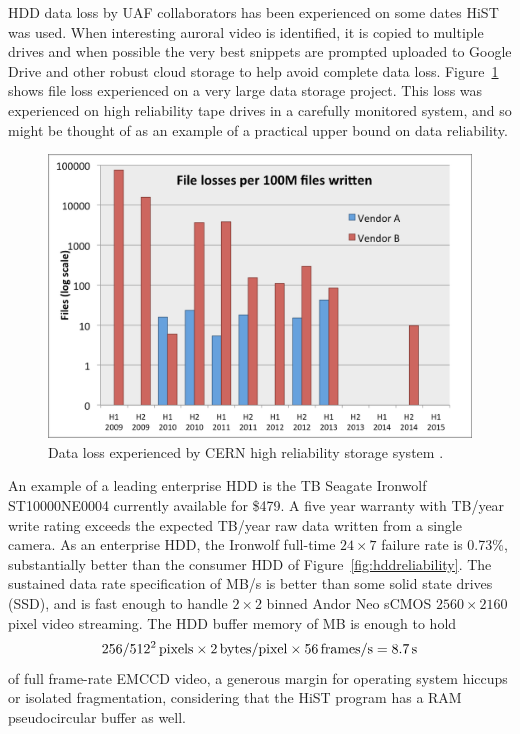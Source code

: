 HDD data loss by UAF collaborators has been experienced on some dates HiST was used.
When interesting auroral video is identified, it is copied to multiple drives and when possible the very best snippets are prompted uploaded to Google Drive and other robust cloud storage to help avoid complete data loss.
Figure~\ref{fig:tapeloss} shows file loss experienced on a very large data storage project.
This loss was experienced on high reliability tape drives in a carefully monitored system, and so might be thought of as an example of a practical upper bound on data reliability.
\begin{figure}
    \includegraphics[width=\linewidth]{gfx/tapeloss}
    \caption{Data loss experienced by CERN high reliability storage system \citep{cancio2015}.}\label{fig:tapeloss}
\end{figure}

An example of a leading enterprise HDD \citep{first10tb} is the \unit[10]{TB} Seagate Ironwolf ST10000NE0004 \citep{ironwolf} currently available for \$479.
A five year warranty with \unit[300]{TB/year} write rating exceeds the expected \unit[265]{TB/year} raw data written from a single camera.
As an enterprise HDD, the Ironwolf full-time $24\times7$ failure rate is 0.73\%, substantially better than the consumer HDD of Figure~\ref{fig:hddreliability}.
The sustained data rate specification of \unit[214]{MB/s} is better than some solid state drives (SSD), and is fast enough to handle $2\times2$ binned Andor Neo sCMOS $2560\times2160$ pixel video streaming.
The HDD buffer memory of \unit[256]{MB} is enough to hold
\begin{equation}
256 / \unit[512^2]{pixels} \times \unit[2]{bytes/pixel} \times \unit[56]{frames/s} = \unit[8.7]{s}
\end{equation}
of full frame-rate EMCCD video, a generous margin for operating system hiccups or isolated fragmentation, considering that the HiST program has a RAM pseudocircular buffer as well.

